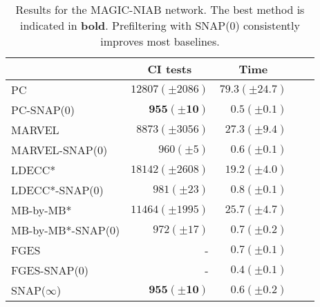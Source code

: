 \begin{table}
\centering
\footnotesize{
\begin{tabular}{lrrrr}
\hline
\multicolumn{1}{c}{} & \multicolumn{1}{c}{CI tests} & \multicolumn{1}{c}{Time} \\ \hline
PC                   & $12807 (\pm 2086)$           & $79.3 (\pm 24.7)$             \\
PC-SNAP($0$)           & $\mathbf{955 (\pm 10)}$       & $0.5 (\pm 0.1)$              \\ \hline
MARVEL               &{$8873 (\pm 3056)$}   & $27.3 (\pm 9.4)$                       \\
MARVEL-SNAP($0$)       & $960 (\pm 5)$                & $0.6 (\pm 0.1)$                       \\ \hline
LDECC*                & $18142 (\pm 2608)$           & $19.2 (\pm 4.0)$           \\
LDECC*-SNAP($0$)        & $981 (\pm 23)$               & $0.8 (\pm0.1)$        \\ \hline
MB-by-MB*             & $11464 (\pm 1995)$           & $25.7 (\pm 4.7)$        \\
MB-by-MB*-SNAP($0$)     & $972 (\pm 17)$               & $0.7 (\pm 0.2)$           \\ \hline
FGES                 & -                            & $0.7 (\pm 0.1)$             \\
FGES-SNAP($0$)         & -                            & $\mathbf{0.4 (\pm 0.1)}$     \\ \hline
SNAP($\infty$)       & $\mathbf{955 (\pm 10)}$       & $0.6 (\pm 0.2)$              \\ \hline
\end{tabular}
\caption{Results for the MAGIC-NIAB network. The best method is indicated in \textbf{bold}. Prefiltering with SNAP($0$) consistently improves most baselines.}
\label{tab:magic-niab}}
\end{table}
